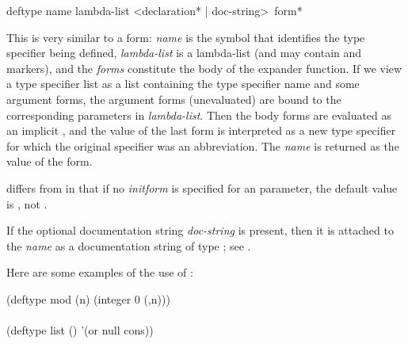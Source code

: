 \begin{defmac}
deftype name lambda-list <{declaration}* | doc-string> {\,form}*

This is very similar to a  form: {\it name} is the
symbol that identifies the type specifier being defined, {\it lambda-list} is
a lambda-list (and may contain  and 
markers), and
the {\it forms} constitute the body of the expander function.  If we view a
type specifier list as a list containing the type specifier name and some argument forms,
the argument forms (unevaluated) are bound to the corresponding
parameters in {\it lambda-list}.  Then the body forms are evaluated
as an implicit , and the value of the last form
is interpreted as a new type specifier for which the original specifier
was an abbreviation.  The {\it name} is returned as the value of the
 form.

 differs from  in that if no {\it initform}
is specified for an  parameter, the default value
is \cd{*}, not {\nil}.

If the optional documentation string {\it doc-string} is present,
then it is attached to the {\it name}
as a documentation string of type ; see .

Here are some examples of the use of :
\begin{lisp}
(deftype mod (n) {\Xbq}(integer 0 (,n))) \\
 \\
(deftype list () '(or null cons))
\end{lisp}



\end{defmac}
